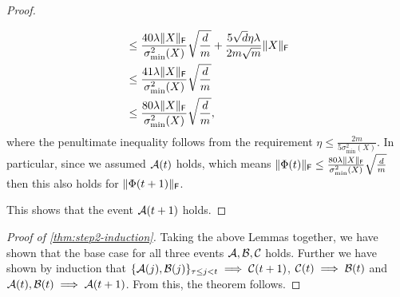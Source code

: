\begin{proof}
\begin{enumerate}
\begin{align*}
      & \leq \frac{40 \lambda \lVert X\rVert_{\mathsf{F}}}{ \sigma_{\min}^2(X)}
      \sqrt{\frac{d}{m}} + \frac{5 \sqrt{d} \eta \lambda}{2m \sqrt{m}} \lVert X\rVert_{\mathsf{F}}\\
      & \leq \frac{41\lambda \lVert X\rVert_{\mathsf{F}}}{\sigma_{\min}^2(X)}
\sqrt{\frac{d}{m}} \\
&\leq \frac{80\lambda \lVert X\rVert_{\mathsf{F}}}{\sigma_{\min}^2(X)}
\sqrt{\frac{d}{m}} ,
  \end{align*}
  where the penultimate inequality follows from the requirement $\eta \leq \frac{2m}{5\sigma_{\min}^2(X)}$.
  In particular, since we assumed $\mathcal{A}(t)$ holds, which means $\lVert\Phi(t)\rVert_{\mathsf{F}} \leq \frac{80 \lambda \lVert X\rVert_{\mathsf{F}}}{\sigma^2_{\min}(X)} \sqrt{\frac{d}{m}}$ then this also holds for $\lVert\Phi(t+1)\rVert_{\mathsf{F}}$. 
\end{enumerate}
This shows that the event $\mathcal{A}(t+1)$ holds.
\end{proof}
\begin{proof}[Proof of \cref{thm:step2-induction}]
    Taking the above Lemmas together, we have shown that the base case for all three events $\mathcal{A}, \mathcal{B}, \mathcal{C}$ holds. Further we have shown by induction that $\{\mathcal{A}(j), \mathcal{B}(j)\}_{\tau \leq j<t} \implies \mathcal{C}(t+1)$, $\mathcal{C}(t) \implies \mathcal{B}(t)$ and $\mathcal{A}(t), \mathcal{B}(t) \implies \mathcal{A}(t+1)$. From this, the theorem follows.
\end{proof}

